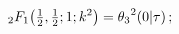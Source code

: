 \[\mathop{{{}_{2}F_{1}}\/}\nolimits\!\left(\tfrac{1}{2},\tfrac{1}{2};1;k^{2}%
\right)={\mathop{\theta_{3}\/}\nolimits^{2}}\!\left(0\middle|\tau\right);\]
